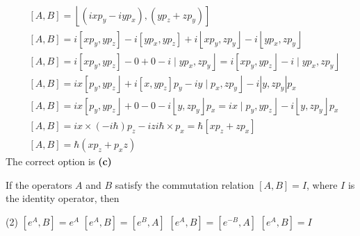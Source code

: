 \begin{enumerate}
\begin{answer}
	\begin{align*}
		&[A, B]=\left\lfloor\left(i x p_{y}-i y p_{x}\right),\left(y p_{z}+z p_{y}\right)\right]\\
		&{[A, B]=i\left[x p_{y}, y p_{z}\right]-i\left[y p_{x}, y p_{z}\right]+i\left\lfloor x p_{y}, z p_{y}\right\rfloor-i\left\lfloor y p_{x}, z p_{y}\right\rfloor} \\
		&\left.\left.[A, B]=i\left[x p_{y}, y p_{z}\right]-0+0-i \mid y p_{x}, z p_{y}\right\rfloor=i\left[x p_{y}, y p_{z}\right\rfloor-i \mid y p_{x}, z p_{y}\right\rfloor \\
		&\left.[A, B]=i x\left[p_{y}, y p_{z}\right\rfloor+i\left[x, y p_{z}\right] p_{y}-i y \mid p_{x}, z p_{y}\right\rfloor-i\left|y, z p_{y}\right| p_{x} \\
		&\left.[A, B]=i x\left[p_{y}, y p_{z}\right\rfloor+0-0-i\left\lfloor y, z p_{y}\right\rfloor p_{x}=i x \mid p_{y}, y p_{z}\right\rfloor-i\left\lfloor y, z p_{y}\right\rfloor p_{x} \\
		&{[A, B]=i x \times(-i \hbar) p_{z}-i z i \hbar \times p_{x}=\hbar\left[x p_{z}+z p_{x}\right]} \\
		&{[A, B]=\hbar\left(x p_{z}+p_{x} z\right)}
	\end{align*}
	The correct option is \textbf{(c)}
\end{answer}
\begin{minipage}{\textwidth}
	\item If the operators $A$ and $B$ satisfy the commutation relation $[A, B]=I$, where $I$ is the identity operator, then
\end{minipage}
\begin{tasks}(2)
	\task[\textbf{A.}] $\left[e^{A}, B\right]=e^{A}$
	\task[\textbf{B.}]$\left[e^{A}, B\right]=\left[e^{B}, A\right]$
	\task[\textbf{C.}]$\left[e^{A}, B\right]=\left[e^{-B}, A\right]$
	\task[\textbf{D.}]$\left[e^{A}, B\right]=I$
\end{tasks}


\end{enumerate}
